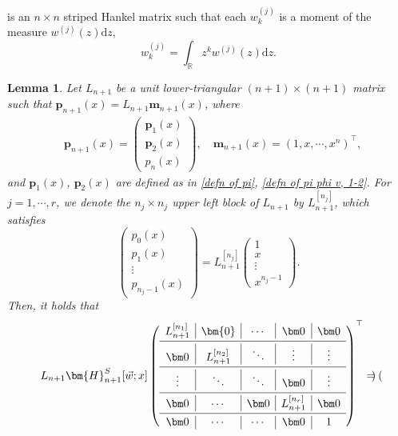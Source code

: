 \documentclass[a4paper,10pt,leqno]{amsart}
\numberwithin{equation}{section}
\newtheorem{lemma}[theorem]{Lemma}
\theoremstyle{remark}
\newcommand{\dd}{\mathrm{d}}
\newcommand{\R}{\mathbb{R}}
\begin{document}
is an $n \times n$ striped Hankel matrix such that each $w^{(j)}_k$ is a moment of the measure $w^{(j)}(z) \dd z$,
\[
w^{(j)}_k = \int_{\R} z^k w^{(j)}(z) \dd z.
\]

\begin{lemma}
Let $L_{n+1}$ be a unit lower-triangular $(n+1) \times (n+1)$ matrix such that \(\bm p_{n+1}(x) = L_{n+1} \bm m_{n+1}(x)\), where 
\begin{align}
&\bm p_{n+1}(x) = \begin{pmatrix}
    \bm p_{1}(x)\\
    \bm p_{2}(x)\\
    p_n(x)
\end{pmatrix}, \quad 
\bm m_{n+1}(x) = \left( 1,x,\cdots,x^{n} \right)^\top,
\end{align}
and $\bm p_{1}(x)$, $\bm p_{2}(x)$ are defined as in \eqref{defn of pi}, \eqref{defn of pi phi v, 1-2}. 
For $j = 1, \cdots, r$, we denote the $n_j \times n_j$ upper left block of $L_{n+1}$ by $L_{n+1}^{[n_j]}$, which satisfies
\[
\begin{pmatrix}
    p_0(x)\\
    p_1(x)\\
    \vdots\\
    p_{n_j-1}(x)
\end{pmatrix} = L_{n+1}^{[n_j]} \begin{pmatrix}
    1\\
    x\\
    \vdots\\
    x^{n_j-1}
\end{pmatrix}.
\]
Then, it holds that
\begin{align}
    L_{n+1} \bm{H}^{S}_{n+1}[\vec{w}; x] \begin{pmatrix}
    \begin{array}{c|c|c|c|c}
      L_{n+1}^{[n_1]} & \bm{0} & \cdots & \bm 0 & \bm 0\\
      \noalign{\vskip 2pt\hrule\vskip 2pt}
      \bm 0 & L_{n+1}^{[n_2]} & \ddots & \vdots & \vdots \\
      \noalign{\vskip 2pt\hrule\vskip 2pt}
      \vdots & \ddots & \ddots & \bm 0 & \vdots \\
      \noalign{\vskip 2pt\hrule\vskip 2pt}
      \bm 0 & \cdots & \bm 0 & L_{n+1}^{[n_r]} & \bm 0\\
      \noalign{\vskip 2pt\hrule\vskip 2pt}
        \bm 0 & \cdots & \cdots & \bm 0 & 1
    \end{array}
    \end{pmatrix}^\top = \begin{pmatrix}

\end{pmatrix}
\end{align}
\end{lemma}
\end{document}

